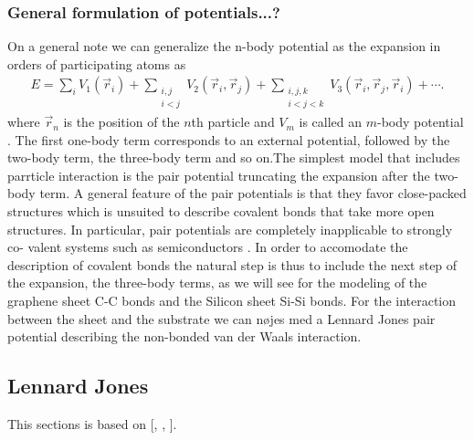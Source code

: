 \subsubsection{General formulation of potentials...?}

On a general note we can generalize the n-body potential as the expansion in
orders of participating atoms as 
\begin{align*}
  E = \sum_i V_1(\vec{r}_i) + 
      \sum_{\substack{i, j \\ i < j}} V_2(\vec{r}_i, \vec{r}_j) +  
      \sum_{\substack{i,j,k \\ i < j < k}} V_3(\vec{r}_i, \vec{r}_j, \vec{r}_i) + \cdots.
\end{align*} 
where $\vec{r}_n$ is the position of the $n$th particle and $V_m$ is called an
$m$-body potential  \cite{PhysRevB.37.6991}. The first one-body term corresponds
to an external potential, followed by the two-body term, the three-body term and
so on.The simplest model that includes parrticle interaction is the pair
potential truncating the expansion after the two-body term. A general feature of
the pair potentials is that they favor close-packed structures which is unsuited
to describe covalent bonds that take more open structures. In particular, pair
potentials are completely inapplicable to strongly co- valent systems such as
semiconductors \cite{PhysRevB.37.6991}. In order to accomodate the description
of covalent bonds the natural step is thus to include the next step of the
expansion, the three-body terms, as we will see for the modeling of the graphene
sheet C-C bonds and the Silicon sheet Si-Si bonds. For the interaction between
the sheet and the substrate we can nøjes med a Lennard Jones pair potential
describing the non-bonded van der Waals interaction.


\subsection{Lennard Jones}
This sections is based on [\cite{docs_lammps_LJ}, \cite{C9CP05445F},
\cite{chem_libretexts_LJ}].


